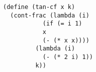 \documentclass[a4paper,12pt]{article}
\begin{document}
\begin{lstlisting}
(define (tan-cf x k)
  (cont-frac (lambda (i)
	       (if (= i 1)
		   x
		   (- (* x x))))
	     (lambda (i)
	       (- (* 2 i) 1))
	     k))	     
\end{lstlisting}
\end{document}
